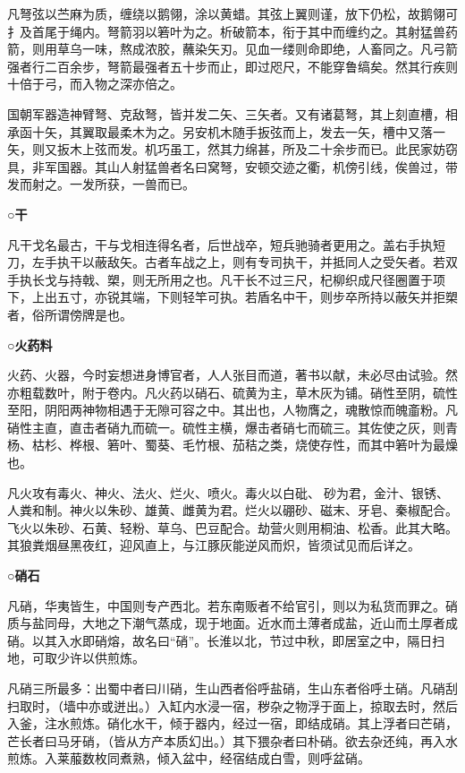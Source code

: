 \documentclass[]{article}
\begin{document}
凡弩弦以苎麻为质，缠绕以鹅翎，涂以黄蜡。其弦上翼则谨，放下仍松，故鹅翎可扌及首尾于绳内。弩箭羽以箬叶为之。析破箭本，衔于其中而缠约之。其射猛兽药箭，则用草乌一味，熬成浓胶，蘸染矢刃。见血一缕则命即绝，人畜同之。凡弓箭强者行二百余步，弩箭最强者五十步而止，即过咫尺，不能穿鲁缟矣。然其行疾则十倍于弓，而入物之深亦倍之。

国朝军器造神臂弩、克敌弩，皆并发二矢、三矢者。又有诸葛弩，其上刻直槽，相承函十矢，其翼取最柔木为之。另安机木随手扳弦而上，发去一矢，槽中又落一矢，则又扳木上弦而发。机巧虽工，然其力绵甚，所及二十余步而已。此民家妨窃具，非军国器。其山人射猛兽者名曰窝弩，安顿交迹之衢，机傍引线，俟兽过，带发而射之。一发所获，一兽而已。

\textbf{○干}

凡干戈名最古，干与戈相连得名者，后世战卒，短兵驰骑者更用之。盖右手执短刀，左手执干以蔽敌矢。古者车战之上，则有专司执干，并抵同人之受矢者。若双手执长戈与持戟、槊，则无所用之也。凡干长不过三尺，杞柳织成尺径圈置于项下，上出五寸，亦锐其端，下则轻竿可执。若盾名中干，则步卒所持以蔽矢并拒槊者，俗所谓傍牌是也。

\textbf{○火药料}

火药、火器，今时妄想进身博官者，人人张目而道，著书以献，未必尽由试验。然亦粗载数叶，附于卷内。凡火药以硝石、硫黄为主，草木灰为铺。硝性至阴，硫性至阳，阴阳两神物相遇于无隙可容之中。其出也，人物膺之，魂散惊而魄齑粉。凡硝性主直，直击者硝九而硫一。硫性主横，爆击者硝七而硫三。其佐使之灰，则青杨、枯杉、桦根、箬叶、蜀葵、毛竹根、茄秸之类，烧使存性，而其中箬叶为最燥也。

凡火攻有毒火、神火、法火、烂火、喷火。毒火以白砒、砂为君，金汁、银锈、人粪和制。神火以朱砂、雄黄、雌黄为君。烂火以硼砂、磁末、牙皂、秦椒配合。飞火以朱砂、石黄、轻粉、草乌、巴豆配合。劫营火则用桐油、松香。此其大略。其狼粪烟昼黑夜红，迎风直上，与江豚灰能逆风而炽，皆须试见而后详之。

\textbf{○硝石}

凡硝，华夷皆生，中国则专产西北。若东南贩者不给官引，则以为私货而罪之。硝质与盐同母，大地之下潮气蒸成，现于地面。近水而土薄者成盐，近山而土厚者成硝。以其入水即硝熔，故名曰``硝''。长淮以北，节过中秋，即居室之中，隔日扫地，可取少许以供煎炼。

凡硝三所最多：出蜀中者曰川硝，生山西者俗呼盐硝，生山东者俗呼土硝。凡硝刮扫取时，（墙中亦或迸出。）入缸内水浸一宿，秽杂之物浮于面上，掠取去时，然后入釜，注水煎炼。硝化水干，倾于器内，经过一宿，即结成硝。其上浮者曰芒硝，芒长者曰马牙硝，（皆从方产本质幻出。）其下猥杂者曰朴硝。欲去杂还纯，再入水煎炼。入莱菔数枚同煮熟，倾入盆中，经宿结成白雪，则呼盆硝。
\end{document}
